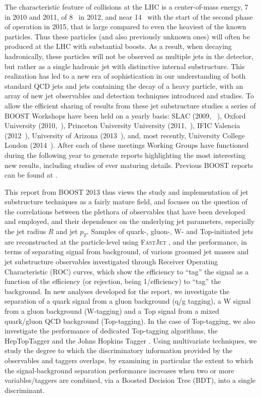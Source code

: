 The characteristic feature of collisions at the LHC is a center-of-mass energy, 7~\tev{} in 2010 and 2011, 
of 8~\tev{} in 2012, and near 14~\tev{} with the start of the second phase of operation in 2015, that is large
compared to even the heaviest of the known particles.  Thus these particles (and also previously unknown ones)
will often be produced at the LHC with
substantial boosts.  As a result, when decaying hadronically, these particles will not be observed as multiple jets in the detector, but rather
as a single hadronic jet with distinctive internal substructure.  This realization has led to a new era of sophistication
in our understanding of  both standard QCD jets and jets containing the decay of a heavy particle, with an array
of new jet observables and detection techniques introduced and studies.  To allow the efficient sharing of 
results from these jet substructure studies a series of BOOST Workshops have been held on a yearly basis:
SLAC (2009, ~\cite{Boost:2009xx}), 
Oxford University (2010,~\cite{Boost:2010xx}), Princeton 
University University (2011,~\cite{Boost:2011xx}),  IFIC Valencia (2012~\cite{Boost:2012xx}), 
University of Arizona (2013~\cite{Boost:2013xx}), and, most recently, University College London (2014~\cite{Boost:2014xx}).
After each of these meetings Working Groups have functioned during the following year to generate reports
highlighting the most interesting new results, including studies of ever maturing details.   Previous BOOST reports
can be found at \cite{Abdesselam:2010pt,Altheimer:2012mn,Altheimer:2013yza}.

This report from BOOST 2013 thus views the study and implementation of jet substructure techniques as a fairly
mature field, and focuses on the question of the correlations between the plethora of observables that have been developed 
and employed, and their dependence on the underlying jet parameters, especially the jet radius $R$ and jet $p_T$. Samples of quark-, gluon-, W- and Top-initiated jets are reconstructed at the particle-level using \textsc{FastJet} \cite{Cacciari:2011ma}, and the performance, in terms of separating signal from background, of various groomed jet masses and jet substructure observables investigated through Receiver Operating Characteristic (ROC) curves, which show the efficiency to ``tag'' the signal as a function of the efficiency (or rejection, being 1/efficiency) to ``tag'' the background. In new analyses developed for the report, we investigate the separation of a quark signal from a gluon background (q/g tagging), a W signal from a gluon background (W-tagging) and a Top signal from a mixed quark/gluon QCD background (Top-tagging). In the case of Top-tagging, we also investigate the performance of dedicated Top-tagging algorithms, the HepTopTagger \cite{Plehn:2010st} and the Johns Hopkins Tagger \cite{Kaplan:2008ie}. Using multivariate techniques, we study the degree to which the discriminatory information provided by the observables and taggers overlaps, by examining in particular the extent to which the signal-background separation performance increases when two or more variables/taggers are combined, via a Boosted Decision Tree (BDT), into a single discriminant. 


